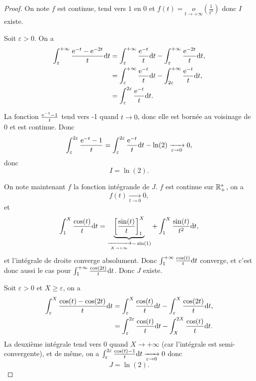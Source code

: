 \documentclass[12pt]{article}
\begin{document}
\begin{proof}
    On note 
    $f$ est continue, tend vers $1$ en 0 et $f(t)=\underset{t\to+\infty}{o}\left(\frac{1}{t^{2}}\right)$ donc $I$ existe.

    Soit $\varepsilon>0$. On a 
    \begin{align}
        \int_{\varepsilon}^{+\infty}\frac{\mathrm{e}^{-t}-\mathrm{e}^{-2t}}{t}\mathrm{d} t
        &=\int_{\varepsilon}^{+\infty}\frac{\mathrm{e}^{-t}}{t}\mathrm{d} t-\int_{\varepsilon}^{+\infty}\frac{\mathrm{e}^{-2t}}{t}\mathrm{d} t,\\
        &=\int_{\varepsilon}^{+\infty}\frac{\mathrm{e}^{-t}}{t}\mathrm{d} t-\int_{2\varepsilon}^{+\infty}\frac{\mathrm{e}^{-t}}{t}\mathrm{d} t,\\
        &=\int_{\varepsilon}^{2\varepsilon}\frac{\mathrm{e}^{-t}}{t}\mathrm{d} t.
    \end{align}

    La fonction $\frac{\mathrm{e}^{-t}-1}{t}$ tend vers -1 quand $t\to0$, donc elle est bornée au voisinage de 0 et est continue. Donc 
    \begin{equation}
        \int_{\varepsilon}^{2\varepsilon}\frac{\mathrm{e}^{-t}-1}{t}=\int_{\varepsilon}^{2\varepsilon}\frac{\mathrm{e}^{-t}}{t}\mathrm{d} t-\ln(2)\xrightarrow[\varepsilon\to0]{}0,
    \end{equation}
    donc 
    \begin{equation}
        \boxed{
            I=\ln(2).
        }
    \end{equation}

    On note maintenant $f$ la fonction intégrande de $J$. $f$ est continue sur $\mathbb{R}_{+}^{*}$, on a 
    \begin{equation}
        f(t)\xrightarrow[t\to0]{}0,    
    \end{equation}
    et 
    \begin{equation}
        \int_{1}^{X}\frac{\cos(t)}{t}\mathrm{d} t=\underbrace{\left[\frac{\sin(t)}{t}\right]_{1}^{X}}_{\xrightarrow[X\to+\infty]{}-\sin(1)}+\int_{1}^{X}\frac{\sin(t)}{t^{2}}\mathrm{d} t,
    \end{equation}
    et l'intégrale de droite converge absolument. Donc $\int_{1}^{+\infty}\frac{\cos(t)}{t}\mathrm{d} t$ converge, et c'est donc aussi le cas pour $\int_{1}^{+\infty}\frac{\cos(2t)}{t}\mathrm{d} t$. Donc $J$ existe.

    Soit $\varepsilon>0$ et $X\geqslant \varepsilon$, on a 
    \begin{align}
        \int_{\varepsilon}^{X}\frac{\cos(t)-\cos(2t)}{t}\mathrm{d} t
        &=\int_{\varepsilon}^{X}\frac{\cos(t)}{t}\mathrm{d} t-\int_{\varepsilon}^{X}\frac{\cos(2t)}{t}\mathrm{d} t,\\
        &=\int_{\varepsilon}^{2\varepsilon}\frac{\cos(t)}{t}\mathrm{d} t-\int_{X}^{2X}\frac{\cos(t)}{t}\mathrm{d} t.
    \end{align}
    La deuxième intégrale tend vers 0 quand $X\to+\infty$ (car l'intégrale est semi-convergente), et de même, on a $\int_{\varepsilon}^{2\varepsilon}\frac{\cos(t)-1}{t}\mathrm{d} t\xrightarrow[\varepsilon\to0]{}0$ donc 
    \begin{equation}
        \boxed{
            J=\ln(2).
        }
    \end{equation}
\end{proof}
\end{document}
